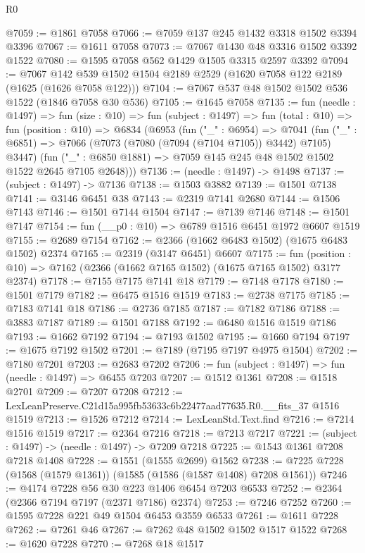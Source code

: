 \begin{lexlean}{R0}
\begin{coremodule}
@7059 := @1861 @7058
@7066 := @7059 @137 @245 @1432 @3318 @1502 @3394 @3396
@7067 := @1611 @7058
@7073 := @7067 @1430 @48 @3316 @1502 @3392 @1522
@7080 := @1595 @7058 @562 @1429 @1505 @3315 @2597 @3392
@7094 := @7067 @142 @539 @1502 @1504 @2189 @2529 (@1620 @7058 @122 @2189 (@1625 (@1626 @7058 @122)))
@7104 := @7067 @537 @48 @1502 @1502 @536 @1522 (@1846 @7058 @30 @536)
@7105 := @1645 @7058
@7135 := fun (needle : @1497) =>
  fun (size : @10) =>
  fun (subject : @1497) =>
  fun (total : @10) =>
  fun (position : @10) =>
  @6834
    (@6953
      (fun ("_" : @6954) =>
      @7041
        (fun ("_" : @6851) => @7066 (@7073 (@7080 (@7094 (@7104 @7105)) @3442) @7105) @3447)
        (fun ("_" : @6850 @1881) => @7059 @145 @245 @48 @1502 @1502 @1522 @2645 @7105 @2648)))
@7136 := (needle : @1497) -> @1498
@7137 := (subject : @1497) -> @7136
@7138 := @1503 @3882
@7139 := @1501 @7138
@7141 := @3146 @6451 @38
@7143 := @2319 @7141 @2680
@7144 := @1506 @7143
@7146 := @1501 @7144 @1504
@7147 := @7139 @7146
@7148 := @1501 @7147
@7154 := fun (__p0 : @10) => @6789 @1516 @6451 @1972 @6607 @1519
@7155 := @2689 @7154
@7162 := @2366 (@1662 @6483 @1502) (@1675 @6483 @1502) @2374
@7165 := @2319 (@3147 @6451) @6607
@7175 := fun (position : @10) => @7162 (@2366 (@1662 @7165 @1502) (@1675 @7165 @1502) @3177 @2374)
@7178 := @7155 @7175 @7141 @18
@7179 := @7148 @7178
@7180 := @1501 @7179
@7182 := @6475 @1516 @1519
@7183 := @2738 @7175
@7185 := @7183 @7141 @18
@7186 := @2736 @7185
@7187 := @7182 @7186
@7188 := @3883 @7187
@7189 := @1501 @7188
@7192 := @6480 @1516 @1519 @7186
@7193 := @1662 @7192
@7194 := @7193 @1502
@7195 := @1660 @7194
@7197 := @1675 @7192 @1502
@7201 := @7189 (@7195 @7197 @4975 @1504)
@7202 := @7180 @7201
@7203 := @2683 @7202
@7206 := fun (subject : @1497) => fun (needle : @1497) => @6455 @7203
@7207 := @1512 @1361
@7208 := @1518 @2701
@7209 := @7207 @7208
@7212 := LexLeanPreserve.C21d15a995fb53633c6b22477aad77635.R0.__fits_37 @1516 @1519
@7213 := @1526 @7212
@7214 := LexLeanStd.Text.find
@7216 := @7214 @1516 @1519
@7217 := @2364 @7216
@7218 := @7213 @7217
@7221 := (subject : @1497) -> (needle : @1497) -> @7209 @7218
@7225 := @1543 @1361 @7208 @7218 @1408
@7228 := @1551 (@1555 @2699) @1562
@7238 := @7225 @7228 (@1568 (@1579 @1361)) (@1585 (@1586 (@1587 @1408) @7208 @1561))
@7246 := @4174 @7228 @56 @30 @223 @1406 @6454 @7203 @6533
@7252 := @2364 (@2366 @7194 @7197 (@2371 @7186) @2374)
@7253 := @7246 @7252
@7260 := @1595 @7228 @221 @49 @1504 @6453 @3559 @6533
@7261 := @1611 @7228
@7262 := @7261 @46
@7267 := @7262 @48 @1502 @1502 @1517 @1522
@7268 := @1620 @7228
@7270 := @7268 @18 @1517

\end{coremodule}
\end{lexlean}

